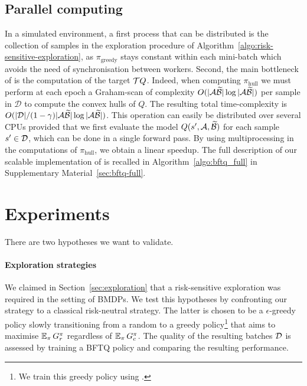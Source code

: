 \documentclass{article}
\begin{document}
\subsection{Parallel computing}

In a simulated environment, a first process that can be distributed is the collection of samples in the exploration procedure of Algorithm~\ref{algo:risk-sensitive-exploration}, as $\pi_\text{greedy}$ stays constant within each mini-batch which avoids the need of synchronisation between workers. Second, the main bottleneck of \BFTQ is the computation of the target $\mathcal{T} Q$. Indeed, when computing $\pi_\text{hull}$ we must perform at each epoch a Graham-scan of complexity $O(|\mathcal{A}\widetilde{\mathcal{B}}| \log |\mathcal{A}\widetilde{\mathcal{B}}|)$ per sample in $\mathcal{D}$ to compute the convex hulls of $Q$. The resulting total time-complexity is $O(|\mathcal{D}|/(1-\gamma) |\mathcal{A}\widetilde{\mathcal{B}}| \log |\mathcal{A}\widetilde{\mathcal{B}}|)$. This operation can easily be distributed over several CPUs provided that we first evaluate the model $Q(s',\mathcal{A},\widetilde{\mathcal{B}})$ for each sample $s'\in\mathcal{D}$, which can be done in a single forward pass. By using multiprocessing in the computations of $\pi_\text{hull}$, we obtain a linear speedup.%
The full description of our scalable implementation of \BFTQ is recalled in Algorithm~\ref{algo:bftq_full} in Supplementary Material~\ref{sec:bftq-full}.

\section{Experiments}

There are two hypotheses we want to validate.

\paragraph{Exploration strategies} We claimed in Section~\ref{sec:exploration} that a risk-sensitive exploration was required in the setting of BMDPs. We test this hypotheses by confronting our strategy to a classical risk-neutral strategy. The latter is chosen to be a $\epsilon$-greedy policy slowly transitioning from a random to a greedy policy\footnote{We train this greedy policy using \FTQ.} that aims to maximise $\operatorname*{\mathbb{E}}_{\pi} G_r^\pi$ regardless of $\operatorname*{\mathbb{E}}_{\pi} G_c^\pi$. The quality of the resulting batches $\mathcal{D}$ is assessed by training a BFTQ policy and comparing the resulting performance.
\end{document}
